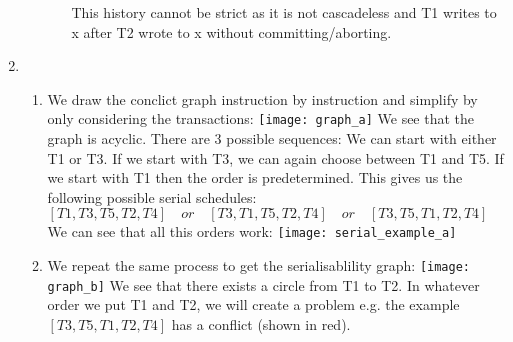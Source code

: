 \documentclass[12pt]{extarticle}
\begin{document}
\begin{flushleft}
\begin{enumerate}[label=\textbf{\Alph*.}]
\begin{enumerate}[label=\arabic*.]
\begin{enumerate}[label=(\alph*)]
This history cannot be strict as it is not cascadeless and T1 writes to x after T2 wrote to x without committing/aborting.
\end{enumerate}
\end{enumerate}
\item \begin{enumerate}[label=(\alph*)]
\item We draw the conclict graph instruction by instruction and simplify by only considering the transactions: \texttt{[image: graph\_a]}
We see that the graph is acyclic. There are 3 possible sequences: We can start with either T1 or T3. If we start with T3, we can again choose between T1 and T5. If we start with T1 then the order is predetermined. This gives us the following possible serial schedules: $[T1, T3, T5, T2, T4 ] \quad or\quad [T3, T1, T5, T2, T4 ] \quad or \quad  [T3,  T5, T1,T2, T4 ] $
We can see that all this orders work:
 \texttt{[image: serial\_example\_a]}
\item We repeat the same process to get the serialisablility graph:
 \texttt{[image: graph\_b]}
 We see that there exists a circle from T1 to T2. In whatever order we put T1 and T2, we will create a problem e.g. the example $[T3,  T5, T1,T2, T4 ] $ has a conflict (shown in red).
\end{enumerate}

\end{enumerate}
\end{flushleft}
\end{document}
